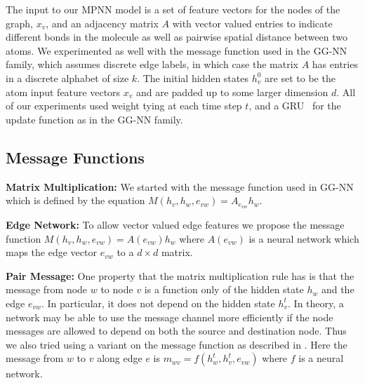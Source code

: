 \documentclass{article}
\newcommand{\mb}[1]{\mathbf{\mathrm{#1}}}
\begin{document}
The input to our MPNN model is a set of feature vectors for the nodes of the graph, $x_v$, and an adjacency matrix $A$ with vector valued entries to indicate different bonds in the molecule as well as pairwise spatial distance between two atoms. We experimented as well with the message function used in the GG-NN family, which assumes discrete edge labels, in which case the matrix $A$ has entries in a discrete alphabet of size $k$. The initial hidden states $h_v^0$ are set to be the atom input feature vectors $x_v$ and are padded up to some larger dimension $d$. All of our experiments used weight tying at each time step $t$, and a GRU~\citep{cho2014properties} for the update function as in the GG-NN family. 

\subsection{Message Functions}

\textbf{Matrix Multiplication:}
	We started with the message function used in GG-NN which is defined by the equation $M(h_v, h_w, e_{vw}) = A_{e_{vw}} h_w$.
	
\textbf{Edge Network:}
	To allow vector valued edge features we propose the message function $M(h_v, h_w, e_{vw}) = A(e_{vw}) h_w$
 where $A(e_{vw})$ is a neural network which maps the edge vector $e_{vw}$ to a $d \times d$ matrix. 

\textbf{Pair Message:}
	   One property that the matrix multiplication rule has is that the message from node $w$ to node $v$ is a function only of the hidden state $h_w$ and the edge $e_{vw}$. In particular, it does not depend on the hidden state $h_v^t$. In theory, a network may be able to use the message channel more efficiently if the node messages are allowed to depend on both the source and destination node. Thus we also tried using a variant on the message function as described in \cite{battaglia2016interaction}. Here the message from $w$ to $v$ along edge $e$ is $m_{wv} = f\left(h_{w}^t, h_{v}^t, e_{vw}\right)$ where $f$ is a neural network.
\end{document}
